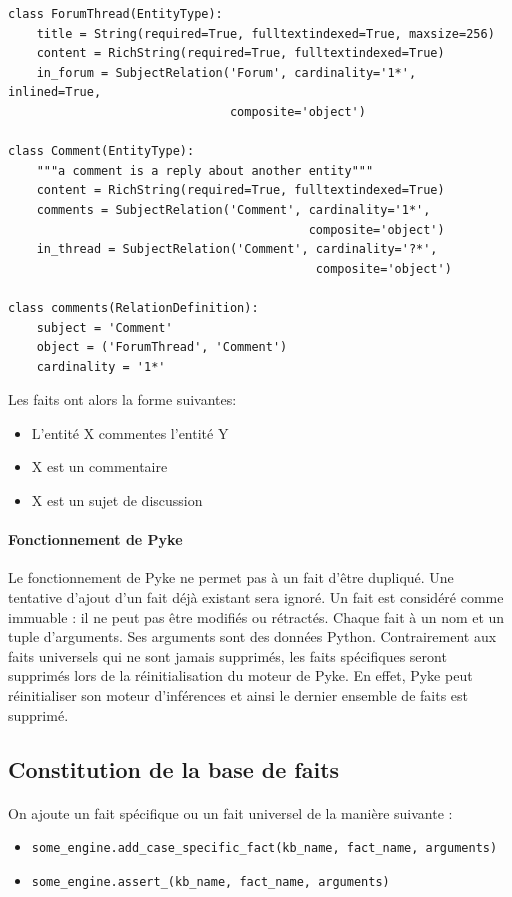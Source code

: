 \documentclass {report}
\begin{document}
\renewcommand{\lstlistingname}{Code}
\begin{lstlisting}[caption= Schéma du cube Forum]
class ForumThread(EntityType):
    title = String(required=True, fulltextindexed=True, maxsize=256)
    content = RichString(required=True, fulltextindexed=True)
    in_forum = SubjectRelation('Forum', cardinality='1*', inlined=True,
                               composite='object')

class Comment(EntityType):
    """a comment is a reply about another entity"""
    content = RichString(required=True, fulltextindexed=True)
    comments = SubjectRelation('Comment', cardinality='1*',
                                          composite='object')
    in_thread = SubjectRelation('Comment', cardinality='?*',
                                           composite='object')

class comments(RelationDefinition):
    subject = 'Comment'
    object = ('ForumThread', 'Comment')
    cardinality = '1*'
\end{lstlisting}

Les faits ont alors la forme suivantes:
\begin{itemize}
\item L'entité X commentes l'entité Y
\item X est un commentaire
\item X est un sujet de discussion
\end{itemize}

\paragraph{Fonctionnement de Pyke}
Le fonctionnement de Pyke ne permet pas à un fait d'être dupliqué. Une tentative d'ajout d'un fait déjà existant sera ignoré. Un fait est considéré comme immuable : il ne peut pas être modifiés ou rétractés. Chaque fait à un nom et un tuple d'arguments. Ses arguments sont des données Python. Contrairement aux faits universels qui ne sont jamais supprimés, les faits spécifiques seront supprimés lors de la réinitialisation du moteur de Pyke. En effet, Pyke peut réinitialiser son moteur d'inférences et ainsi le dernier ensemble de faits est supprimé.


\subsection{Constitution de la base de faits}
\paragraph{}
On ajoute un fait spécifique ou un fait universel de la manière suivante :
\begin{itemize}
    \item \verb+some_engine.add_case_specific_fact(kb_name, fact_name, arguments)+
    \item \verb+some_engine.assert_(kb_name, fact_name, arguments)+    
\end{itemize}
\end{document}
